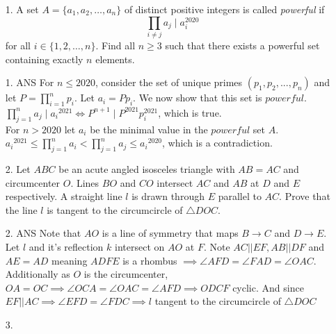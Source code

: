 \documentclass{article}
\begin{document}
\begin{enumerate}

\medskip
\item[1.] %
A set $A = \{a_1, a_2, \dotsc, a_n\}$ of distinct positive integers is called \emph{powerful} if
\[ \prod_{i \neq j} a_j \mid a_i^{2020} \]
for all $i \in \{1, 2, \dotsc, n\}$.
Find all $n \ge 3$ such that there exists a powerful set containing exactly $n$ elements.

\item[1. ANS]
For $n\leq2020$, consider the set of unique primes $(p_1,p_2,...,p_n)$ and let $P = \prod_{i=1}^{n} p_i$. Let $a_i = Pp_i$. We now show that this set is $powerful$.
\\$\prod_{j=1}^{n} a_j \mid {a_i}^{2021} \iff P^{n+1} \mid P^{2021}p_i^{2021}$, which is true.
\\For $n>2020$ let $a_i$ be the minimal value in the $powerful$ set $A$.
\\${a_i}^{2021} \leq \prod_{j=1}^{n} a_i <  \prod_{j=1}^{n} a_j \leq {a_i}^{2020}$, which is a contradiction.


\medskip
\item[2.] %
Let $ABC$ be an acute angled isosceles triangle with $AB = AC$ and circumcenter $O$.
Lines $BO$ and $CO$ intersect $AC$ and $AB$ at $D$ and $E$ respectively.
A straight line $l$ is drawn through $E$ parallel to $AC$.
Prove that the line $l$ is tangent to the circumcircle of $\triangle DOC$.
\item[2. ANS]
Note that $AO$ is a line of symmetry that maps $B\rightarrow C$ and $D\rightarrow E$. Let $l$ and it's reflection $k$ intersect on $AO$ at $F$.
Note $AC||EF, AB||DF$ and $AE=AD$ meaning $ADFE$ is a rhombus $\implies \angle AFD = \angle FAD = \angle OAC$.
Additionally as $O$ is the circumcenter, $OA = OC \implies \angle OCA = \angle OAC = \angle AFD \implies ODCF$ cyclic.
And since $EF||AC\implies\angle EFD = \angle FDC\implies l$ tangent to the circumcircle of $\triangle DOC$


\medskip
\item[3.]



\end{enumerate}
\end{document}
